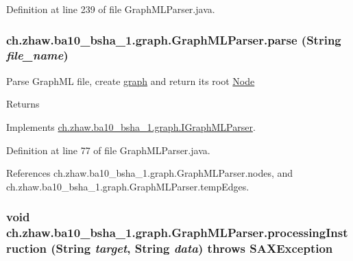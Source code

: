 Definition at line 239 of file GraphMLParser.java.\hypertarget{classch_1_1zhaw_1_1ba10__bsha__1_1_1graph_1_1GraphMLParser_ae127bee890029b56abc11c84d2badd1c}{
\subsubsection[{parse}]{ ch.zhaw.ba10\_\-bsha\_\-1.graph.GraphMLParser.parse (String {\em file\_\-name})}}
\label{classch_1_1zhaw_1_1ba10__bsha__1_1_1graph_1_1GraphMLParser_ae127bee890029b56abc11c84d2badd1c}
Parse GraphML file, create \hyperlink{namespacech_1_1zhaw_1_1ba10__bsha__1_1_1graph}{graph} and return its root \hyperlink{classch_1_1zhaw_1_1ba10__bsha__1_1_1graph_1_1Node}{Node}

\begin{DoxyReturn}{Returns}

\end{DoxyReturn}


Implements \hyperlink{interfacech_1_1zhaw_1_1ba10__bsha__1_1_1graph_1_1IGraphMLParser_a4b7516793ccd484abfe8ab83f4e57fa8}{ch.zhaw.ba10\_\-bsha\_\-1.graph.IGraphMLParser}.

Definition at line 77 of file GraphMLParser.java.

References ch.zhaw.ba10\_\-bsha\_\-1.graph.GraphMLParser.nodes, and ch.zhaw.ba10\_\-bsha\_\-1.graph.GraphMLParser.tempEdges.\hypertarget{classch_1_1zhaw_1_1ba10__bsha__1_1_1graph_1_1GraphMLParser_a4db4f0e906963188c539de8c429477c3}{
\subsubsection[{processingInstruction}]{\setlength{\rightskip}{0pt plus 5cm}void ch.zhaw.ba10\_\-bsha\_\-1.graph.GraphMLParser.processingInstruction (String {\em target}, \/  String {\em data})  throws SAXException }}
\label{classch_1_1zhaw_1_1ba10__bsha__1_1_1graph_1_1GraphMLParser_a4db4f0e906963188c539de8c429477c3}


